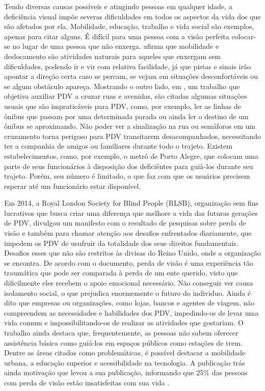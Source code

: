 \documentclass[english,brazilian]{UNISINOSmonografia}
\begin{document}
Tendo diversas causas possíveis e atingindo pessoas em qualquer idade, a deficiência visual impõe severas dificuldades em todos os aspectos da vida dos que são afetados por ela. Mobilidade, educação, trabalho e vida social são exemplos, apenas para citar alguns. É difícil para uma pessoa com a visão perfeita colocar-se no lugar de uma pessoa que não enxerga.  afirma que mobilidade e deslocamento são atividades naturais para aqueles que enxergam sem dificuldades, podendo ir e vir com relativa facilidade, já que pistas e sinais irão apontar a direção certa caso se percam, se vejam em situações desconfortáveis ou se algum obstáculo apareça. Mostrando o outro lado, em , um trabalho que objetiva auxiliar PDV a cruzar ruas e avenidas, são citadas algumas situações usuais que são impraticáveis para PDV, como, por exemplo, ler as linhas de ônibus que passam por uma determinada parada ou ainda ler o destino de um ônibus se aproximando. Não poder ver a sinalização na rua ou semáforos em um cruzamento torna perigoso para PDV transitarem desacompanhados, necessitando ter a companhia de amigos ou familiares durante todo o trajeto. Existem estabelecimentos, como, por exemplo, o metrô de Porto Alegre, que colocam uma parte de seus funcionários à disposição dos deficiêntes para guià-los durante seu trajeto. Porém, seu número é limitado, o que faz com que os usuários precisem esperar até um funcionário estar disponível.

Em 2014, a Royal London Society for Blind People (RLSB), organização sem fins lucrativos que busca criar uma diferença que melhore a vida das futuras gerações de PDV, divulgou um manifesto com o resultado de pesquisas sobre perda de visão e também para chamar atenção aos desafios enfrentados diariamente, que impedem os PDV de usufruir da totalidade dos seus direitos fundamentais. Desafios esses que não são restritos às divisas do Reino Unido, onde a organização se encontra.
De acordo com o documento, perda de visão é uma experiência tão traumática que pode ser comparada à perda de um ente querido, visto que dificilmente eles recebem o apoio emocional necessário. Não conseguir ver causa isolamento social, o que prejudica enormemente o futuro do individuo. Ainda é dito que empresas ou organizações, como lojas, bancos e agentes de viagem, não compreendem as necessidades e habilidades dos PDV, impedindo-os de levar uma vida comum e impossibilitando-os de realizar as atividades que gostariam. O trabalho ainda destaca que, frequentemente, as pessoas não sabem oferecer assistência básica como guiá-los em espaços públicos como estações de trem. Dentre as áreas citadas como problemáticas, é possível destacar a mobilidade urbana, a educação superior e acessibilidade na tecnologia. A publicação trás ainda motivação que levou a sua publicação, informando que 25\% das pessoas com perda de visão estão insatisfeitas com sua vida \cite{YouthManifesto}.
\end{document}
